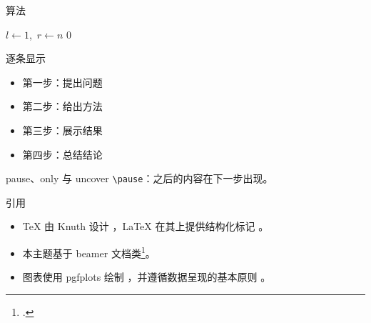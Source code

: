\documentclass[aspectratio=169,10pt]{beamer}
\begin{document}
\begin{frame}{算法}
  \footnotesize
  \begin{algorithm}[H]
    \caption{二分查找}
    $l \gets 1$,\ $r \gets n$\;
    \Return $0$\;
  \end{algorithm}
\end{frame}


\begin{frame}{逐条显示}
  \small
  \begin{itemize}[<+->]\setlength{\itemsep}{2.4mm}
    \item 第一步：提出问题
    \item 第二步：给出方法
    \item 第三步：展示结果
    \item 第四步：总结结论
  \end{itemize}
\end{frame}

\begin{frame}{pause、only 与 uncover}
  \small
  \texttt{\textbackslash pause}：之后的内容在下一步出现。
  \pause
  \par\vspace{3mm}
  \par\vspace{3mm}
\end{frame}


\begin{frame}{引用}
  \small
  \begin{itemize}\setlength{\itemsep}{2.4mm}
    \item \TeX{} 由 Knuth 设计 \cite{knuth1984texbook}，\LaTeX{} 在其上提供结构化标记 \cite{lamport1994latex}。
    \item 本主题基于 beamer 文档类\footcite{tantau2023beamer}。
    \item 图表使用 pgfplots 绘制 \cite{feuersanger2024pgfplots}，并遵循数据呈现的基本原则 \cite{tufte2001visual}。
  \end{itemize}
\end{frame}
\end{document}
